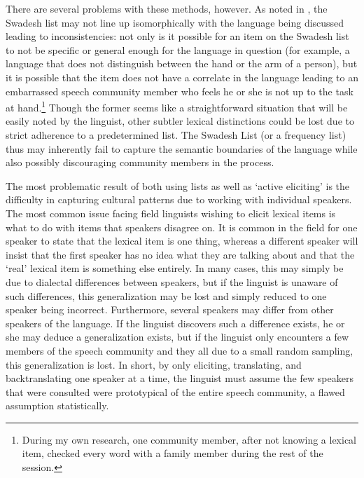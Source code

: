 \documentclass[output=paper,
modfonts
]{langscibook}
\begin{document}
There are several problems with these methods, however. As noted in \citet{Mosel2004}, the Swadesh list may not line up isomorphically with the language being discussed leading to inconsistencies:  not only is it possible for an item on the Swadesh list to not be specific or general enough for the language in question (for example, a language that does not distinguish between the hand or the arm of a person), but it is possible that the item does not have a correlate in the language leading to an embarrassed speech community member who feels he or she is not up to the task at hand.\footnote{ During my own research, one community member, after not knowing a lexical item, checked every word with a family member during the rest of the session. } Though the former seems like a straightforward situation that will be easily noted by the linguist, other subtler lexical distinctions could be lost due to strict adherence to a predetermined list. The Swadesh List (or a frequency list) thus may inherently fail to capture the semantic boundaries of the language while also possibly discouraging community members in the process. 

The most problematic result of both using lists as well as ‘active eliciting’ is the difficulty in capturing cultural patterns due to working with individual speakers. The most common issue facing field linguists wishing to elicit lexical items is what to do with items that speakers disagree on. It is common in the field for one speaker to state that the lexical item is one thing, whereas a different speaker will insist that the first speaker has no idea what they are talking about and that the ‘real’ lexical item is something else entirely. In many cases, this may simply be due to dialectal differences between speakers, but if the linguist is unaware of such differences, this generalization may be lost and simply reduced to one speaker being incorrect. Furthermore, several speakers may differ from other speakers of the language. If the linguist discovers such a difference exists, he or she may deduce a generalization exists, but if the linguist only encounters a few members of the speech community and they all  due to a small random sampling, this generalization is lost. In short, by only eliciting, translating, and backtranslating one speaker at a time, the linguist must assume the few speakers that were consulted were prototypical of the entire speech community, a flawed assumption statistically.
\end{document}
